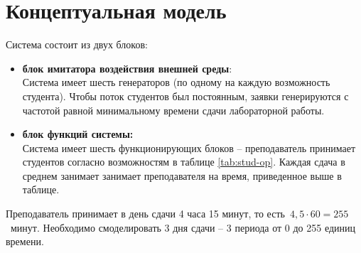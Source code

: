 \chapter{Концептуальная модель}
Система состоит из двух блоков:
\begin{itemize}
	\item \textbf{блок имитатора воздействия внешней среды}:\\
	Система имеет шесть генераторов (по одному на каждую возможность студента). 	Чтобы поток студентов был постоянным, заявки генерируются с частотой равной минимальному времени сдачи лабораторной работы.
	\item \textbf{блок функций системы:}\\
	Система имеет шесть функционирующих блоков -- преподаватель принимает студентов согласно возможностям в таблице \ref{tab:stud-op}. Каждая сдача в среднем занимает занимает преподавателя на время, приведенное выше в таблице.
\end{itemize}

Преподаватель принимает в день сдачи 4 часа 15 минут, то есть~$4,5\cdot60=255$~минут. Необходимо смоделировать 3 дня сдачи -- 3 периода от 0 до 255 единиц времени.


